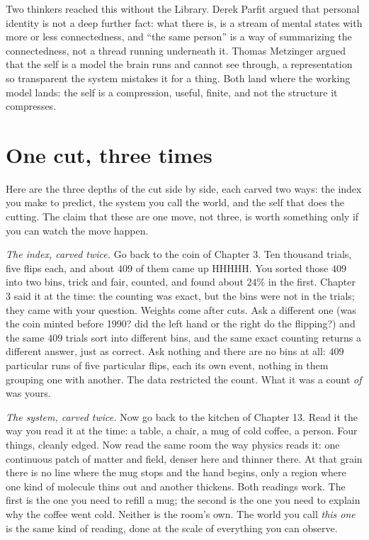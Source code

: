 Two thinkers reached this without the Library. Derek Parfit argued that personal identity is not a deep further fact: what there is, is a stream of mental states with more or less connectedness, and ``the same person'' is a way of summarizing the connectedness, not a thread running underneath it. Thomas Metzinger argued that the self is a model the brain runs and cannot see through, a representation so transparent the system mistakes it for a thing. Both land where the working model lands: the self is a compression, useful, finite, and not the structure it compresses.

\section*{One cut, three times}

Here are the three depths of the cut side by side, each carved two ways: the index you make to predict, the system you call the world, and the self that does the cutting. The claim that these are one move, not three, is worth something only if you can watch the move happen.

\emph{The index, carved twice.} Go back to the coin of Chapter 3. Ten thousand trials, five flips each, and about $409$ of them came up HHHHH. You sorted those $409$ into two bins, trick and fair, counted, and found about $24\%$ in the first. Chapter 3 said it at the time: the counting was exact, but the bins were not in the trials; they came with your question. Weights come after cuts. Ask a different one (was the coin minted before 1990? did the left hand or the right do the flipping?) and the same $409$ trials sort into different bins, and the same exact counting returns a different answer, just as correct. Ask nothing and there are no bins at all: $409$ particular runs of five particular flips, each its own event, nothing in them grouping one with another. The data restricted the count. What it was a count \emph{of} was yours.

\emph{The system, carved twice.} Now go back to the kitchen of Chapter 13. Read it the way you read it at the time: a table, a chair, a mug of cold coffee, a person. Four things, cleanly edged. Now read the same room the way physics reads it: one continuous patch of matter and field, denser here and thinner there. At that grain there is no line where the mug stops and the hand begins, only a region where one kind of molecule thins out and another thickens. Both readings work. The first is the one you need to refill a mug; the second is the one you need to explain why the coffee went cold. Neither is the room's own. The world you call \emph{this one} is the same kind of reading, done at the scale of everything you can observe.

